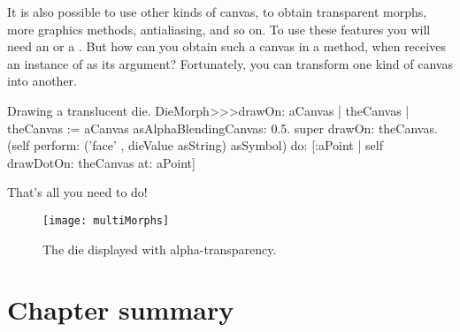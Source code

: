 \documentclass[a4paper,10pt,twoside]{book}
\begin{document}
It is also possible to use other kinds of canvas, to obtain transparent morphs, more graphics methods, antialiasing, and so on.
To use these features you will need an  or a .
But how can you obtain such a canvas in a  method, when  receives an instance of  as its argument?
Fortunately, you can transform one kind of canvas into another.

\begin{method}{Drawing a translucent die.}
DieMorph>>>drawOn: aCanvas
	| theCanvas |
	theCanvas := aCanvas asAlphaBlendingCanvas: 0.5.
	super drawOn: theCanvas.
	(self perform: ('face' , dieValue asString) asSymbol)
		do: [:aPoint | self drawDotOn: theCanvas at: aPoint]
\end{method}
\noindent
That's all you need to do!

\begin{figure}[ht]
	\centerline{\texttt{[image: multiMorphs]}}
	\caption{The die displayed with alpha-transparency.
		}
\end{figure}





\section{Chapter summary}
\end{document}
